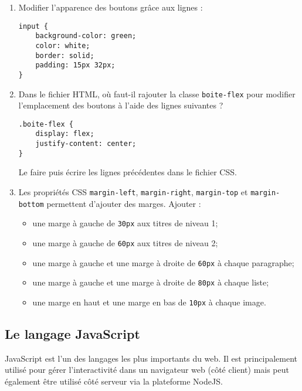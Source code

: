 \documentclass[a4paper]{article}
\begin{document}
\begin{enumerate}
  \item Modifier l'apparence des boutons grâce aux lignes :
    \begin{verbatim}
input {
    background-color: green;
    color: white;
    border: solid;
    padding: 15px 32px;
}
    \end{verbatim}
  \item Dans le fichier HTML, où faut-il rajouter la classe \texttt{boite-flex} pour modifier l'emplacement des boutons à l'aide des lignes suivantes ?
    \begin{verbatim}
.boite-flex {
    display: flex;
    justify-content: center;
}
    \end{verbatim}
    Le faire puis écrire les lignes précédentes dans le fichier CSS.
  \item Les propriétés CSS \texttt{margin-left}, \texttt{margin-right}, \texttt{margin-top} et \texttt{margin-bottom} permettent d'ajouter des marges. Ajouter :
    \begin{itemize}
      \item une marge à gauche de \texttt{30px} aux titres de niveau 1;
      \item une marge à gauche de \texttt{60px} aux titres de niveau 2;
      \item une marge à gauche et une marge à droite de \texttt{60px} à chaque paragraphe;
      \item une marge à gauche et une marge à droite de \texttt{80px} à chaque liste;
      \item une marge en haut et une marge en bas de \texttt{10px} à chaque image.
    \end{itemize}
\end{enumerate}

\pagebreak

\subsection{Le langage JavaScript}
JavaScript est l'un des langages les plus importants du web. Il est principalement utilisé pour gérer l'interactivité dans un navigateur web (côté client) mais peut également être utilisé côté serveur via la plateforme NodeJS.

\bigskip
\end{document}
